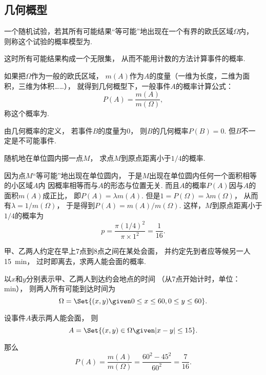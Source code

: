 \subsection{几何概型}
\begin{definition}
一个随机试验，若其所有可能结果“等可能”地出现在一个有界的欧氏区域\(\Omega\)内，
则称这个试验的概率模型为.
\end{definition}
这时所有可能结果构成一个无限集，
从而不能用计数的方法计算事件的概率.

\begin{definition}
如果把\(\Omega\)作为一般的欧氏区域，
\(m(A)\)作为\(A\)的度量（一维为长度，二维为面积，三维为体积……），
就得到几何概型下，一般事件\(A\)的概率计算公式：\begin{equation*}
	P(A) = \frac{m(A)}{m(\Omega)},
\end{equation*}
称这个概率为.
\end{definition}
由几何概率的定义，
若事件\(B\)的度量为0，
则\(B\)的几何概率\(P(B)=0\).
但\(B\)不一定是不可能事件.

\begin{example}
随机地在单位圆内掷一点\(M\)，
求点\(M\)到原点距离小于\(1/4\)的概率.
\begin{solution}
因为点\(M\)“等可能”地出现在单位圆内，
于是\(M\)出现在单位圆内任何一个面积相等的小区域\(A\)内
因概率相等而与\(A\)的形态与位置无关.
而且\(A\)的概率\(P(A)\)因与\(A\)的面积\(m(A)\)成正比，
即\(P(A)=\lambda m(A)\).
但是\(1 = P(\Omega) = \lambda m(\Omega)\)，
从而有\(\lambda = 1/m(\Omega)\)，
于是得到\(P(A) = m(A)/m(\Omega)\).
这样，\(M\)到原点距离小于\(1/4\)的概率为\begin{equation*}
	p = \frac{\pi (1/4)^2}{\pi \times 1^2} = \frac{1}{16}.
\end{equation*}
\end{solution}
\end{example}

\begin{example}[会面问题]
甲、乙两人约定在早上7点到8点之间在某处会面，
并约定先到者应等候另一人15~min，
过时即离去，求两人能会面的概率.
\begin{solution}
以\(x\)和\(y\)分别表示甲、乙两人到达约会地点的时间
（从7点开始计时，单位：min），
则两人所有可能到达时间为\begin{equation*}
	\Omega = \Set{ (x,y) \given 0 \leq x \leq 60, 0 \leq y \leq 60 }.
\end{equation*}

设事件\(A\)表示两人能会面，
则\begin{equation*}
	A = \Set{ (x,y)\in\Omega \given \abs{x-y} \leq 15 }.
\end{equation*}

那么\begin{equation*}
	P(A) = \frac{m(A)}{m(\Omega)}
	= \frac{60^2 - 45^2}{60^2}
	= \frac{7}{16}.
\end{equation*}
\end{solution}
\end{example}


